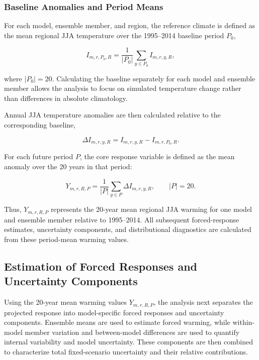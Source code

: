 \documentclass[
]{krantz}
\begin{document}
\subsubsection{Baseline Anomalies and Period Means}\label{baseline-anomalies-and-period-means}

For each model, ensemble member, and region, the reference climate is defined as the mean regional JJA temperature over the 1995--2014 baseline period \(P_0\),

\[
I_{m,r,P_0,R}
=
\frac{1}{|P_0|}
\sum_{y\in P_0}
I_{m,r,y,R},
\]

where \(|P_0|=20\). Calculating the baseline separately for each model and ensemble member allows the analysis to focus on simulated temperature change rather than differences in absolute climatology.

Annual JJA temperature anomalies are then calculated relative to the corresponding baseline,

\[
\Delta I_{m,r,y,R}
=
I_{m,r,y,R}
-
I_{m,r,P_0,R}.
\]

For each future period \(P\), the core response variable is defined as the mean anomaly over the 20 years in that period:

\begin{equation}
Y_{m,r,R,P}
=
\frac{1}{|P|}
\sum_{y\in P}
\Delta I_{m,r,y,R},
\qquad |P|=20.
\label{eq:unc-period-mean-warming}
\end{equation}

Thus, \(Y_{m,r,R,P}\) represents the 20-year mean regional JJA warming for one model and ensemble member relative to 1995--2014. All subsequent forced-response estimates, uncertainty components, and distributional diagnostics are calculated from these period-mean warming values.

\subsection{Estimation of Forced Responses and Uncertainty Components}\label{estimation-of-forced-responses-and-uncertainty-components}

Using the 20-year mean warming values \(Y_{m,r,R,P}\), the analysis next separates the projected response into model-specific forced responses and uncertainty components. Ensemble means are used to estimate forced warming, while within-model member variation and between-model differences are used to quantify internal variability and model uncertainty. These components are then combined to characterize total fixed-scenario uncertainty and their relative contributions.
\end{document}
